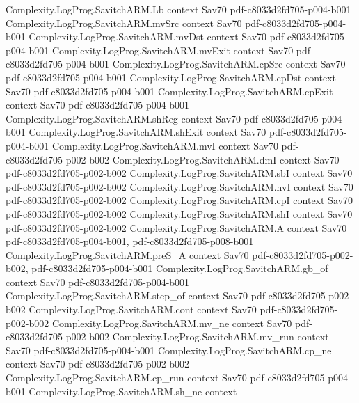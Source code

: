 \begin{theorem}
\proofstep
  {Complexity.LogProg.SavitchARM.Lb}
  {context}
  {Sav70}
  {pdf-c8033d2fd705-p004-b001}
\proofstep
  {Complexity.LogProg.SavitchARM.mvSrc}
  {context}
  {Sav70}
  {pdf-c8033d2fd705-p004-b001}
\proofstep
  {Complexity.LogProg.SavitchARM.mvDst}
  {context}
  {Sav70}
  {pdf-c8033d2fd705-p004-b001}
\proofstep
  {Complexity.LogProg.SavitchARM.mvExit}
  {context}
  {Sav70}
  {pdf-c8033d2fd705-p004-b001}
\proofstep
  {Complexity.LogProg.SavitchARM.cpSrc}
  {context}
  {Sav70}
  {pdf-c8033d2fd705-p004-b001}
\proofstep
  {Complexity.LogProg.SavitchARM.cpDst}
  {context}
  {Sav70}
  {pdf-c8033d2fd705-p004-b001}
\proofstep
  {Complexity.LogProg.SavitchARM.cpExit}
  {context}
  {Sav70}
  {pdf-c8033d2fd705-p004-b001}
\proofstep
  {Complexity.LogProg.SavitchARM.shReg}
  {context}
  {Sav70}
  {pdf-c8033d2fd705-p004-b001}
\proofstep
  {Complexity.LogProg.SavitchARM.shExit}
  {context}
  {Sav70}
  {pdf-c8033d2fd705-p004-b001}
\proofstep
  {Complexity.LogProg.SavitchARM.mvI}
  {context}
  {Sav70}
  {pdf-c8033d2fd705-p002-b002}
\proofstep
  {Complexity.LogProg.SavitchARM.dmI}
  {context}
  {Sav70}
  {pdf-c8033d2fd705-p002-b002}
\proofstep
  {Complexity.LogProg.SavitchARM.sbI}
  {context}
  {Sav70}
  {pdf-c8033d2fd705-p002-b002}
\proofstep
  {Complexity.LogProg.SavitchARM.hvI}
  {context}
  {Sav70}
  {pdf-c8033d2fd705-p002-b002}
\proofstep
  {Complexity.LogProg.SavitchARM.cpI}
  {context}
  {Sav70}
  {pdf-c8033d2fd705-p002-b002}
\proofstep
  {Complexity.LogProg.SavitchARM.shI}
  {context}
  {Sav70}
  {pdf-c8033d2fd705-p002-b002}
\proofstep
  {Complexity.LogProg.SavitchARM.A}
  {context}
  {Sav70}
  {pdf-c8033d2fd705-p004-b001,
    pdf-c8033d2fd705-p008-b001}
\proofstep
  {Complexity.LogProg.SavitchARM.preS_A}
  {context}
  {Sav70}
  {pdf-c8033d2fd705-p002-b002,
    pdf-c8033d2fd705-p004-b001}
\proofstep
  {Complexity.LogProg.SavitchARM.gb_of}
  {context}
  {Sav70}
  {pdf-c8033d2fd705-p004-b001}
\proofstep
  {Complexity.LogProg.SavitchARM.step_of}
  {context}
  {Sav70}
  {pdf-c8033d2fd705-p002-b002}
\proofstep
  {Complexity.LogProg.SavitchARM.cont}
  {context}
  {Sav70}
  {pdf-c8033d2fd705-p002-b002}
\proofstep
  {Complexity.LogProg.SavitchARM.mv_ne}
  {context}
  {Sav70}
  {pdf-c8033d2fd705-p002-b002}
\proofstep
  {Complexity.LogProg.SavitchARM.mv_run}
  {context}
  {Sav70}
  {pdf-c8033d2fd705-p004-b001}
\proofstep
  {Complexity.LogProg.SavitchARM.cp_ne}
  {context}
  {Sav70}
  {pdf-c8033d2fd705-p002-b002}
\proofstep
  {Complexity.LogProg.SavitchARM.cp_run}
  {context}
  {Sav70}
  {pdf-c8033d2fd705-p004-b001}
\proofstep
  {Complexity.LogProg.SavitchARM.sh_ne}
  {context}

\end{theorem}
